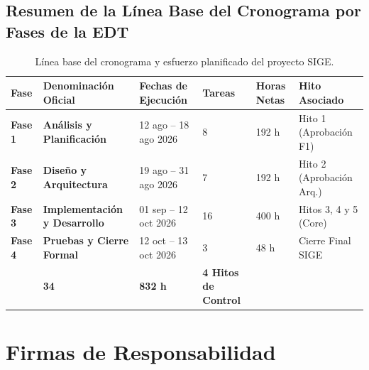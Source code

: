 \documentclass[12pt,a4paper]{article}
\begin{document}
\subsection{Resumen de la Línea Base del Cronograma por Fases de la EDT}
\begin{table}[H]
\centering
\small
\renewcommand{\arraystretch}{1.2}
\begin{tabularx}{\textwidth}{|>{\hsize=0.3\hsize\centering\arraybackslash\footnotesize}X|>{\hsize=1.3\hsize\raggedright\arraybackslash\bfseries\footnotesize}X|>{\hsize=1.0\hsize\raggedright\arraybackslash\footnotesize}X|>{\hsize=0.8\hsize\centering\arraybackslash\footnotesize}X|>{\hsize=0.8\hsize\centering\arraybackslash\footnotesize}X|>{\hsize=0.8\hsize\centering\arraybackslash\footnotesize}X|}
\hline
\rowcolor{tableheader}
\textbf{Fase} & \textbf{Denominación Oficial} & \textbf{Fechas de Ejecución} & \textbf{Tareas} & \textbf{Horas Netas} & \textbf{Hito Asociado} \\
\hline
\textbf{Fase 1} & Análisis y Planificación & 12 ago -- 18 ago 2026 & 8 & 192 h & Hito 1 (Aprobación F1) \\
\hline
\textbf{Fase 2} & Diseño y Arquitectura & 19 ago -- 31 ago 2026 & 7 & 192 h & Hito 2 (Aprobación Arq.) \\
\hline
\textbf{Fase 3} & Implementación y Desarrollo & 01 sep -- 12 oct 2026 & 16 & 400 h & Hitos 3, 4 y 5 (Core) \\
\hline
\textbf{Fase 4} & Pruebas y Cierre Formal & 12 oct -- 13 oct 2026 & 3 & 48 h & Cierre Final SIGE \\
\hline
\multicolumn{3}{|r|}{\textbf{TOTAL CONSOLIDADO DEL PROYECTO:}} & \textbf{34} & \textbf{832 h} & \textbf{4 Hitos de Control} \\
\hline
\end{tabularx}
\caption{Línea base del cronograma y esfuerzo planificado del proyecto SIGE.}
\label{tab:cronograma_resumen}
\end{table}

\section{Firmas de Responsabilidad}
\end{document}
